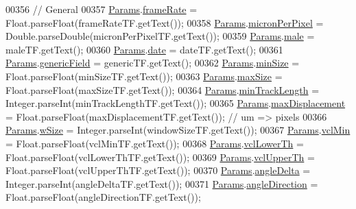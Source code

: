 \begin{DoxyCode}
{00356     \textcolor{comment}{// General}
00357     \hyperlink{classdata_1_1_params}{Params}.\hyperlink{classdata_1_1_params_a398ccb086e2e7150576bec8a5853b8e3}{frameRate} = Float.parseFloat(frameRateTF.getText());
00358     \hyperlink{classdata_1_1_params}{Params}.\hyperlink{classdata_1_1_params_a19331ee97ef3c422984fc7dff976549e}{micronPerPixel} = Double.parseDouble(micronPerPixelTF.getText());
00359     \hyperlink{classdata_1_1_params}{Params}.\hyperlink{classdata_1_1_params_a3e07114fb70a676dfe24fad6be8c3c75}{male} = maleTF.getText();
00360     \hyperlink{classdata_1_1_params}{Params}.\hyperlink{classdata_1_1_params_aecbab8174a6d72649883508cf9940d58}{date} = dateTF.getText();
00361     \hyperlink{classdata_1_1_params}{Params}.\hyperlink{classdata_1_1_params_a253e4e926c0399ed1ae42b5a5989824d}{genericField} = genericTF.getText();
00362     \hyperlink{classdata_1_1_params}{Params}.\hyperlink{classdata_1_1_params_a0aac8d82501e8bd6df290478d853662b}{minSize} = Float.parseFloat(minSizeTF.getText());
00363     \hyperlink{classdata_1_1_params}{Params}.\hyperlink{classdata_1_1_params_a7274c4f365a3b3d5e70f4c0e797684ac}{maxSize} = Float.parseFloat(maxSizeTF.getText());
00364     \hyperlink{classdata_1_1_params}{Params}.\hyperlink{classdata_1_1_params_aa730fe10ba7a04b3871e8ff2ea8cc834}{minTrackLength} = Integer.parseInt(minTrackLengthTF.getText());
00365     \hyperlink{classdata_1_1_params}{Params}.\hyperlink{classdata_1_1_params_ab28f784a26ca9d2ce7d7a785b158aa61}{maxDisplacement} = Float.parseFloat(maxDisplacementTF.getText()); \textcolor{comment}{// um =>
       pixels}
00366     \hyperlink{classdata_1_1_params}{Params}.\hyperlink{classdata_1_1_params_ad1b7844e5f66ee81c3de06d1a8ca645e}{wSize} = Integer.parseInt(windowSizeTF.getText());
00367     \hyperlink{classdata_1_1_params}{Params}.\hyperlink{classdata_1_1_params_af4cb43f0bfe24c14e75780187235376c}{vclMin} = Float.parseFloat(vclMinTF.getText());
00368     \hyperlink{classdata_1_1_params}{Params}.\hyperlink{classdata_1_1_params_af9a2118a2e00978d900279677c64bbeb}{vclLowerTh} = Float.parseFloat(vclLowerThTF.getText());
00369     \hyperlink{classdata_1_1_params}{Params}.\hyperlink{classdata_1_1_params_ae0c29f446e3d569d730c8251a31e7ac2}{vclUpperTh} = Float.parseFloat(vclUpperThTF.getText());
00370     \hyperlink{classdata_1_1_params}{Params}.\hyperlink{classdata_1_1_params_a93caa48162e34b2227a839ed71b4ed44}{angleDelta} = Integer.parseInt(angleDeltaTF.getText());
00371     \hyperlink{classdata_1_1_params}{Params}.\hyperlink{classdata_1_1_params_a11ad187f45e1f7add56bde4071bfdf74}{angleDirection} = Float.parseFloat(angleDirectionTF.getText());
}
\end{DoxyCode}
